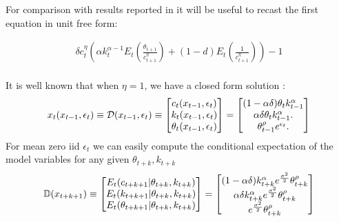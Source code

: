 \documentclass[12pt]{article}
\begin{document}
For comparison with results reported in \citep{Judd2014} it will be useful
to recast the first equation in unit free form:

\begin{gather*}
\delta c_t^{\eta}\left ( \alpha k_{t}^{\alpha-1} E_t \left (\frac{\theta_{t+1}}{c_{t+1}^\eta} \right )+ (1-d)E_t\left (\frac{1}{c_{t+1}^\eta} \right ) \right ) -1\\
\end{gather*}

It is well known that when $\eta=1$, we have a closed form solution \citep{lettau03}:
\begin{gather}
x_t({x_{t-1},\epsilon_t})\equiv    \mathcal{D}({x_{t-1},\epsilon_t})\equiv
   \begin{bmatrix}
     c_t({x_{t-1},\epsilon_t})\\k_t({x_{t-1},\epsilon_t})\\ \theta_t({x_{t-1},\epsilon_t})
   \end{bmatrix}=
   \begin{bmatrix}
(1-\alpha \delta) \theta_{t} k_{t-1}^\alpha\\
  \alpha \delta \theta_{t} k_{t-1}^\alpha.\label{soln}\\
\theta_{t-1}^\rho e^{\epsilon_t}.
   \end{bmatrix}
\end{gather}
For mean zero iid $\epsilon_t$ we can easily 
compute the conditional expectation of the model variables for any given $\theta_{t+k},k_{t+k}$
\begin{gather*}
  \mathbb{D}(x_{t+k+1})\equiv
  \begin{bmatrix}
  E_t(c_{t+k+1}|\theta_{t+k},k_{t+k})\\
  E_t(k_{t+k+1}|\theta_{t+k},k_{t+k})\\
  E_t(\theta_{t+k+1}|\theta_{t+k},k_{t+k})
  \end{bmatrix}=
  \begin{bmatrix}
(1-\alpha\delta)k_{t+k}^\alpha e^{\frac{\sigma^2}{2}}\theta_{t+k}^\rho\\
\alpha\delta k_{t+k}^\alpha e^{\frac{\sigma^2}{2}}\theta_{t+k}^\rho\\
e^{\frac{\sigma^2}{2}}\theta_{t+k}^\rho
  \end{bmatrix}
\end{gather*}
\end{document}
